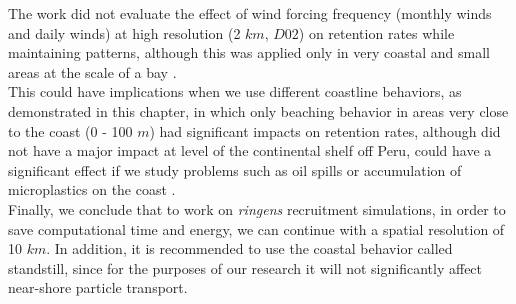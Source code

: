The work did not evaluate the effect of wind forcing frequency (monthly winds and daily winds) at high resolution (2 $km$, $D02$) on retention rates while maintaining patterns, although this was applied only in very coastal and small areas at the scale of a bay \citep{FlorTam2019}.\\

This could have implications when we use different coastline behaviors, as demonstrated in this chapter, in which only beaching behavior in areas very close to the coast (0 - 100 $m$) had significant impacts on retention rates, although did not have a major impact at level of the continental shelf off Peru, could have a significant effect if we study problems such as oil spills or accumulation of microplastics on the coast \citep{AtwoFalc2019,LopeNajj2021}.\\

Finally, we conclude that to work on \textit{\gls{ringens}} recruitment simulations, in order to save computational time and energy, we can continue with a spatial resolution of 10 $km$. In addition, it is recommended to use the coastal behavior called standstill, since for the purposes of our research it will not significantly affect near-shore particle transport.\\

\clearpage
